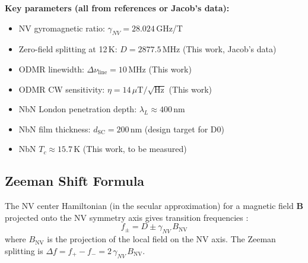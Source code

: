 \textbf{Key parameters (all from references or Jacob's data):}
\begin{itemize}
  \item NV gyromagnetic ratio: $\gamma_{NV} = 28.024$\,GHz/T \cite{Doherty2013}
  \item Zero-field splitting at 12\,K: $D = 2877.5$\,MHz (This work, Jacob's data)
  \item ODMR linewidth: $\Delta\nu_\text{line} = 10$\,MHz (This work)
  \item ODMR CW sensitivity: $\eta = 14\,\mu\text{T}/\sqrt{\text{Hz}}$ (This work)
  \item NbN London penetration depth: $\lambda_L \approx 400$\,nm
        \cite{Kamlapure2010}
  \item NbN film thickness: $d_\text{SC} = 200$\,nm (design target for D0)
  \item NbN $T_c \approx 15.7$\,K (This work, to be measured)
\end{itemize}

\subsection{Zeeman Shift Formula}
\label{sec:oq1_zeeman}

The NV center Hamiltonian (in the secular approximation) for a magnetic
field $\mathbf{B}$ projected onto the NV symmetry axis gives transition
frequencies \cite{Barry2020,Doherty2013}:
\begin{equation}
  f_\pm = D \pm \gamma_{NV}\, B_\text{NV}
  \label{eq:oq1_zeeman}
\end{equation}
where $B_\text{NV}$ is the projection of the local field on the NV axis.
The Zeeman splitting is $\Delta f = f_+ - f_- = 2\,\gamma_{NV}\,B_\text{NV}$.


